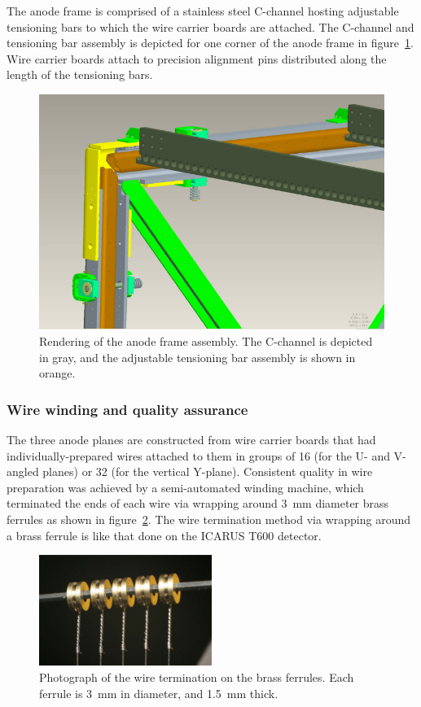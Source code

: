 The anode frame is comprised of a stainless steel C-channel hosting adjustable tensioning bars to which the wire carrier boards are attached. The C-channel and tensioning bar assembly is depicted for one corner of the anode frame in figure~\ref{fig:anode-frame-3dmodel}.  Wire carrier boards attach to precision alignment pins distributed along the length of the tensioning bars. 

\begin{figure}
\centering	
\includegraphics[width=0.8\linewidth]{figures/anode-frame-3dmodel.pdf}
\caption{Rendering of the anode frame assembly.  The C-channel is depicted in gray, and the adjustable tensioning bar assembly is shown in orange.}
\label{fig:anode-frame-3dmodel}
\end{figure}

\subsubsection{Wire winding and quality assurance}

The three anode planes are constructed from wire carrier boards that had individually-prepared wires attached to them in groups of 16 (for the U- and V- angled planes) or 32 (for the vertical Y-plane).  Consistent quality in wire preparation was achieved by a semi-automated winding machine, which terminated the ends of each wire via wrapping around 3~mm diameter brass ferrules as shown in figure~\ref{fig:ferrules}.   The wire termination method via wrapping around a brass ferrule is like that done on the ICARUS T600 detector.  
\begin{figure}
\centering
\includegraphics[width=0.5\textwidth]{figures/wire-twist.pdf}
\caption{Photograph of the wire termination on the brass ferrules.  Each ferrule is 3~mm in diameter, and 1.5~mm thick.}
\label{fig:ferrules}
\end{figure}

